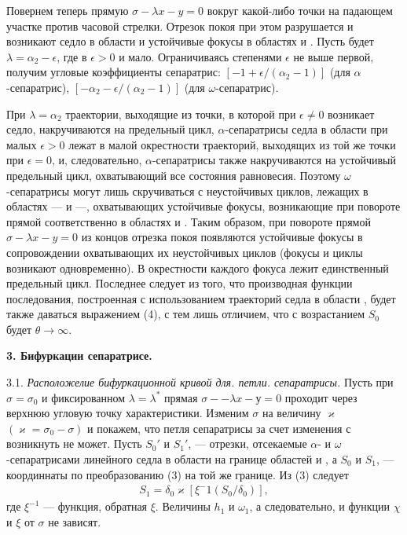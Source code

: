 \documentclass{article}
\newcommand{\RomanNumeralCaps}[1]
    {\MakeUppercase{\romannumeral #1}}
\begin{document}
Повернем теперь прямую $\sigma - \lambda x - y = 0$ вокруг какой-либо
точки на падающем участке против часовой стрелки. Отрезок
покоя при этом разрушается и возникают седло в области \RomanNumeralCaps{2} и
устойчивые фокусы в областях \RomanNumeralCaps{1} и \RomanNumeralCaps{3}. Пусть будет $\lambda = \alpha_{2} - \epsilon$,
где в $\epsilon > 0$ и мало. Ограничиваясь степенями $\epsilon$ не выше первой,
получим угловые коэффициенты сепаратрис: $[-1 + \epsilon / (\alpha_{2} - 1)]$
(для $\alpha$-сепаратрис), $[-\alpha_{2} - \epsilon / (\alpha_{2} - 1)]$ (для $\omega$-сепаратрис).

При $\lambda = \alpha_{2}$ траектории, выходящие из точки, в которой при
$\epsilon \neq 0$ возникает седло, накручиваются на предельный цикл, $\alpha$-сепаратрисы 
седла в области \RomanNumeralCaps{2} при малых $\epsilon > 0$ лежат в малой
окрестности траекторий, выходящих из той же точки при $\epsilon = 0$,
и, следовательно, $\alpha$-сепаратрисы также накручиваются на устойчивый 
предельный цикл, охватывающий все состояния равновесия. 
Поэтому $\omega$-сепаратрисы могут лишь скручиваться с неустойчивых 
циклов, лежащих в областях \RomanNumeralCaps{1}—\RomanNumeralCaps{2} и \RomanNumeralCaps{2}—\RomanNumeralCaps{3}, охватывающих устойчивые фокусы, возникающие при повороте прямой соответственно 
в областях \RomanNumeralCaps{1} и \RomanNumeralCaps{3}. Таким образом, при повороте
прямой $\sigma - \lambda x - y = 0$ из концов отрезка покоя появляются устойчивые 
фокусы в сопровождении охватывающих их неустойчивых
циклов (фокусы и циклы возникают одновременно). В окрестности
каждого фокуса лежит единственный предельный цикл. Последнее 
следует из того, что производная функции последования, построенная 
с использованием траекторий седла в области \RomanNumeralCaps{2}, будет
также даваться выражением (4), с тем лишь отличием, что с возрастанием 
$S_{0}$ будет $\theta \rightarrow \infty$.

\textbf{3. Бифуркации сепаратрисе.}

3.1. \textit{Расположелие бифуркационной кривой для. петли. сепаратрисы.} 
Пусть при $\sigma = \sigma_{0}$ и фиксированном $\lambda = \lambda^*$ прямая $\sigma -
- \lambda x - у = 0$ проходит через верхнюю угловую точку характеристики.
Изменим $\sigma$ на величину $\varkappa$ $(\varkappa = \sigma_{0} - \sigma)$ и покажем, что петля 
сепаратрисы за счет изменения с возникнуть не может. Пусть
$S_{0}'$ и $S_{1}'$, — отрезки, отсекаемые $\alpha$- и $\omega$-сепаратрисами линейного
седла в области \RomanNumeralCaps{2} на границе областей \RomanNumeralCaps{1} и \RomanNumeralCaps{2}, а $S_{0}$ и $S_{1}$, — координнаты 
по преобразованию (3) на той же границе. Из (3) следует
\begin{gather}
S_{1} = \delta_{0} \varkappa [\xi^-1 (S_{0} / \delta_{0})],
\tag{6}
\end{gather}
где $\xi^{-1}$ — функция, обратная $\xi$. Величины $h_{1}$ и $\omega_{1}$, а следовательно, 
и функции $\chi$ и $\xi$ от $\sigma$ не зависят.
\end{document}
